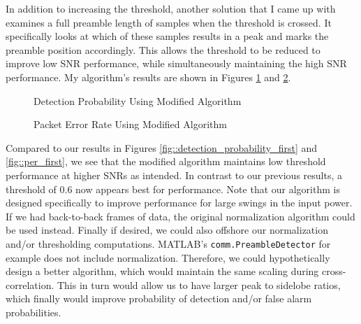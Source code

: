 \documentclass{article}
\begin{document}
	In addition to increasing the threshold, another solution that I came up with examines a full preamble length of samples when the threshold is crossed. It specifically looks at which of these samples results in a peak and marks the preamble position accordingly. This allows the threshold to be reduced to improve low SNR performance, while simultaneously maintaining the high SNR performance. My algorithm's results are shown in Figures \ref{fig::detection_probability_mod} and \ref{fig::per_mod}.
	
\begin{figure}[H]
	\centerline{}
	\caption{Detection Probability Using Modified Algorithm}
	\label{fig::detection_probability_mod}
\end{figure}

\begin{figure}[H]
	\centerline{}
	\caption{Packet Error Rate Using Modified Algorithm}
	\label{fig::per_mod}
\end{figure}

\noindent Compared to our results in Figures \ref{fig::detection_probability_first} and \ref{fig::per_first}, we see that the modified algorithm maintains low threshold performance at higher SNRs as intended. In contrast to our previous results, a threshold of 0.6 now appears best for performance. Note that our algorithm is designed specifically to improve performance for large swings in the input power. If we had back-to-back frames of data, the original normalization algorithm could be used instead. Finally if desired, we could also offshore our normalization and/or thresholding computations. MATLAB's \texttt{comm.PreambleDetector} for example does not include normalization. Therefore, we could hypothetically design a better algorithm, which would maintain the same scaling during cross-correlation. This in turn would allow us to have larger peak to sidelobe ratios, which finally would improve probability of detection and/or false alarm probabilities.
\end{document}
